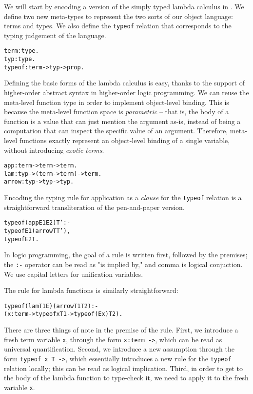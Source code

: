 \documentclass[format=acmlarge,review,anonymous]{acmart}\settopmatter{printfolios=true}
\begin{document}
We will start by encoding a version of the simply typed lambda calculus in \lamprolog. We define two
new meta-types to represent the two sorts of our object language: terms and types. We also define
the \texttt{typeof} relation that corresponds to the typing judgement of the language.

\begin{alltt}
term   : type.
typ    : type.
typeof : term -> typ -> prop.
\end{alltt}

Defining the basic forms of the lambda calculus is easy, thanks to the support of higher-order
abstract syntax in higher-order logic programming. We can reuse the meta-level function type in
order to implement object-level binding. This is because the meta-level function space is
\textit{parametric} -- that is, the body of a function is a value that can just mention the argument
as-is, instead of being a computation that can inspect the specific value of an argument. Therefore,
meta-level functions exactly represent an object-level binding of a single variable, without
introducing \textit{exotic terms}.

\begin{alltt}
app    : term -> term -> term.
lam    : typ -> (term -> term) -> term.
arrow  : typ -> typ -> typ.
\end{alltt}

Encoding the typing rule for application as a \lamprolog \textit{clause} for the \texttt{typeof} relation is a
straightforward transliteration of the pen-and-paper version.

\begin{alltt}
typeof (app E1 E2) T' :-
  typeof E1 (arrow T T'),
  typeof E2 T.
\end{alltt}

In logic programming, the goal of a rule is written first, followed by the premises; the \texttt{:-}
operator can be read as "is implied by," and comma is logical conjuction. We use capital letters for
unification variables.

The rule for lambda functions is similarly straightforward: 

\begin{alltt}
typeof (lam T1 E) (arrow T1 T2) :-
  (x:term -> typeof x T1 -> typeof (E x) T2).
\end{alltt}

There are three things of note in the premise of the rule. First, we introduce a fresh term variable
\texttt{x}, through the form \texttt{x:term ->}, which can be read as universal quantification. Second, we
introduce a new assumption through the form \texttt{typeof x T ->}, which essentially introduces a new rule
for the \texttt{typeof} relation locally; this can be read as logical implication. Third, in order to get
to the body of the lambda function to type-check it, we need to apply it to the fresh variable \texttt{x}.
\end{document}
